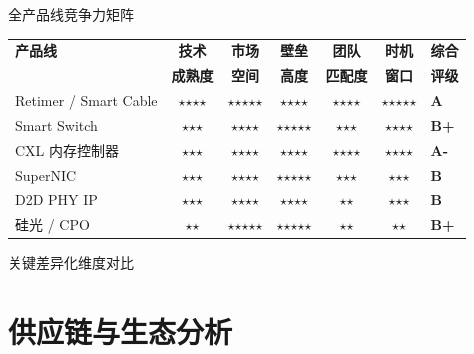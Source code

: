 \documentclass[aspectratio=169, 10pt, UTF8]{ctexbeamer}
\begin{document}
\begin{frame}{全产品线竞争力矩阵}
  \centering
  \footnotesize
  \begin{tabularx}{\textwidth}{p{2.4cm} c c c c c p{2.2cm}}
    \toprule
    \textbf{产品线} & \textbf{技术} & \textbf{市场} & \textbf{壁垒} & \textbf{团队} & \textbf{时机} & \textbf{综合} \\
    & \textbf{成熟度} & \textbf{空间} & \textbf{高度} & \textbf{匹配度} & \textbf{窗口} & \textbf{评级} \\
    \midrule
    Retimer / Smart Cable
      & $\star$$\star$$\star$$\star$ & $\star$$\star$$\star$$\star$$\star$ & $\star$$\star$$\star$$\star$ & $\star$$\star$$\star$$\star$ & $\star$$\star$$\star$$\star$$\star$ & \textbf{A} \\
    \addlinespace
    Smart Switch
      & $\star$$\star$$\star$ & $\star$$\star$$\star$$\star$ & $\star$$\star$$\star$$\star$$\star$ & $\star$$\star$$\star$ & $\star$$\star$$\star$$\star$ & \textbf{B+} \\
    \addlinespace
    CXL 内存控制器
      & $\star$$\star$$\star$ & $\star$$\star$$\star$$\star$ & $\star$$\star$$\star$$\star$ & $\star$$\star$$\star$$\star$ & $\star$$\star$$\star$$\star$ & \textbf{A-} \\
    \addlinespace
    SuperNIC
      & $\star$$\star$$\star$ & $\star$$\star$$\star$$\star$ & $\star$$\star$$\star$$\star$$\star$ & $\star$$\star$$\star$ & $\star$$\star$$\star$ & \textbf{B} \\
    \addlinespace
    D2D PHY IP
      & $\star$$\star$$\star$ & $\star$$\star$$\star$$\star$ & $\star$$\star$$\star$$\star$ & $\star$$\star$ & $\star$$\star$$\star$ & \textbf{B} \\
    \addlinespace
    硅光 / CPO
      & $\star$$\star$ & $\star$$\star$$\star$$\star$$\star$ & $\star$$\star$$\star$$\star$$\star$ & $\star$$\star$ & $\star$$\star$ & \textbf{B+} \\
    \bottomrule
  \end{tabularx}
\end{frame}

\begin{frame}{关键差异化维度对比}
  \centering
\end{frame}

\section{供应链与生态分析}
\end{document}

